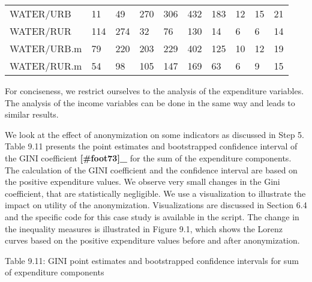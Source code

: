 \documentclass[letterpaper,10pt,english]{sphinxmanual}
\begin{document}
\begin{savenotes}\sphinxattablestart
\centering
\begin{tabulary}{\linewidth}[t]{|T|T|T|T|T|T|T|T|T|T|}
\hline
\sphinxstyletheadfamily &\sphinxstyletheadfamily 
{}
&\sphinxstyletheadfamily 
{}
&\sphinxstyletheadfamily 
{}
&\sphinxstyletheadfamily 
{}
&\sphinxstyletheadfamily 
{}
&\sphinxstyletheadfamily 
{}
&\sphinxstyletheadfamily 
{}
&\sphinxstyletheadfamily 
{}
&\sphinxstyletheadfamily 
{}
\\
\hline
WATER/URB
&
11
&
49
&
270
&
306
&
432
&
183
&
12
&
15
&
21
\\
\hline
WATER/RUR
&
114
&
274
&
32
&
76
&
130
&
14
&
6
&
6
&
14
\\
\hline
WATER/URB.m
&
79
&
220
&
203
&
229
&
402
&
125
&
10
&
12
&
19
\\
\hline
WATER/RUR.m
&
54
&
98
&
105
&
147
&
169
&
63
&
6
&
9
&
15
\\
\hline
\end{tabulary}
\par
\sphinxattableend\end{savenotes}

For conciseness, we restrict ourselves to the analysis of the
expenditure variables. The analysis of the income variables can be done
in the same way and leads to similar results.

We look at the effect of anonymization on some indicators as discussed
in Step 5. Table 9.11 presents the point estimates and bootstrapped
confidence interval of the GINI coefficient {\color{red}\bfseries{}{[}\#foot73{]}\_} for
the sum of the expenditure components. The calculation of the GINI
coefficient and the confidence interval are based on the positive
expenditure values. We observe very small changes in the Gini
coefficient, that are statistically negligible. We use a visualization
to illustrate the impact on utility of the anonymization. Visualizations
are discussed in Section 6.4 and the specific  code for this case
study is available in the  script. The change in the inequality
measures is illustrated in Figure 9.1, which shows the Lorenz curves
based on the positive expenditure values before and after anonymization.

Table 9.11: GINI point estimates and bootstrapped confidence intervals
for sum of expenditure components
\end{document}
